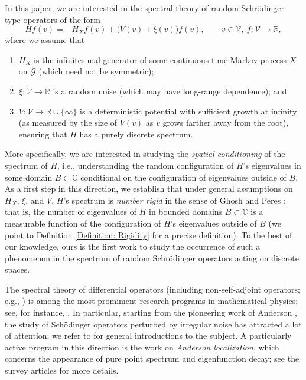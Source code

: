 \documentclass{amsart}
\numberwithin{equation}{section}
\theoremstyle{definition}
\newcommand\mbb{\mathbb}
\newcommand\ms{\mathscr}
\begin{document}
%

In this paper, we are interested in the spectral theory of
random Schr\"odinger-type operators of the form
\[Hf(v)=-H_Xf(v)+\big(V(v)+\xi(v)\big)f(v),\qquad v\in\ms V,~f:\ms V\to\mbb R,\]
where we assume that
\begin{enumerate}
\item $H_X$ is the infinitesimal generator of some continuous-time
Markov process $X$ on $\ms G$ (which need not be symmetric);
\item $\xi:\ms V\to\mbb R$ is a random noise (which may have long-range
dependence); and
\item $V:\ms V\to\mbb R\cup\{\infty\}$ is a deterministic potential with sufficient growth
at infinity (as measured by the size of $V(v)$ as $v$ grows farther away from
the root), ensuring that $H$ has a purely discrete spectrum.
\end{enumerate}
More specifically, we are interested in studying the {\it spatial conditioning} of the spectrum
of $H$, i.e., understanding the random configuration of $H$'s eigenvalues in some domain
$B\subset\mbb C$ conditional on the configuration of eigenvalues outside of $B$.
As a first step in this direction, we establish that under general assumptions on $H_X$, $\xi$, and $V$,
$H$'s spectrum is {\it number rigid} in the sense of Ghosh and Peres \cite{GP17}; that is,
the number of eigenvalues of $H$ in bounded domains $B\subset\mbb C$
is a measurable function of the configuration of $H$'s eigenvalues outside of $B$
(we point to Definition \ref{Definition: Rigidity} for a precise definition).      
To the best of our knowledge, ours is the first work to study the occurrence of
such a phenomenon in the spectrum of random Schr\"odinger operators acting on discrete spaces.

%

The spectral theory of differential operators (including non-self-adjoint operators; e.g.,
\cite{AAD01,Bo17,davies1980,DN02,DHK09,FKV18,H17,KL18,LS09}) is among the
most promiment research programs in mathematical physics; see, for instance, 
\cite{HislopSigal,Teschl}. In particular, starting from the pioneering
work of Anderson \cite{Anderson58}, the study of Sch\"odinger
operators perturbed by irregular noise has attracted a lot of attention; we refer
to \cite{AizenmanWarzel,CarLac} for general introductions to the subject. A particularly active program in this direction
is the work on {\it Anderson localization}, which concerns the appearance of
pure point spectrum and eigenfunction decay; see the survey articles \cite{H08,K08,St11}
for more details.
\end{document}
